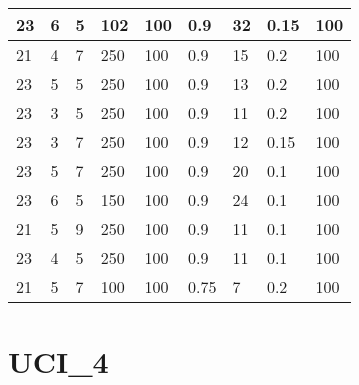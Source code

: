 \begin{table}[!ht]
\begin{tabular}{|l|l|l|l|l|l|l|l|l|}
        23 & 6 & 5 & 102 & 100 & 0.9 & 32 & 0.15 & 100 \\ \hline
        21 & 4 & 7 & 250 & 100 & 0.9 & 15 & 0.2 & 100 \\ \hline
        23 & 5 & 5 & 250 & 100 & 0.9 & 13 & 0.2 & 100 \\ \hline
        23 & 3 & 5 & 250 & 100 & 0.9 & 11 & 0.2 & 100 \\ \hline
        23 & 3 & 7 & 250 & 100 & 0.9 & 12 & 0.15 & 100 \\ \hline
        23 & 5 & 7 & 250 & 100 & 0.9 & 20 & 0.1 & 100 \\ \hline
        23 & 6 & 5 & 150 & 100 & 0.9 & 24 & 0.1 & 100 \\ \hline
        21 & 5 & 9 & 250 & 100 & 0.9 & 11 & 0.1 & 100 \\ \hline
        23 & 4 & 5 & 250 & 100 & 0.9 & 11 & 0.1 & 100 \\ \hline
        21 & 5 & 7 & 100 & 100 & 0.75 & 7 & 0.2 & 100 \\ \hline
    \end{tabular}
\end{table}


\section{UCI_4}

